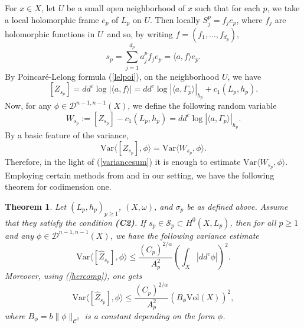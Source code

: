 \documentclass[11pt,leqno,oneside]{amsart}
\newtheorem{thm}{Theorem}[section]
\numberwithin{equation}{section}
\begin{document}
For \( x \in X \), let \( U \) be a small open neighborhood of \( x \) such that
for each \( p \), we take a local holomorphic frame \( e_{p} \) of \( L_{p} \) on \( U \). Then locally $S^{p}_{j}=f_{j}e_{p}$, where $f_{j}$ are holomorphic functions in $U$\, and so, by writing $f=(f_{1}, \ldots, f_{d_{p}}),$ $$s_{p}=\sum_{j=1}^{d_{p}}{a_{j}^{p}f_{j}e_{p}}=\langle a, f \rangle e_{p}.$$By Poincar\'{e}-Lelong formula (\ref{lelpoi}), on the neighborhood $U$, we have $$ [Z_{s_{p}}]=dd^{c}\log{|\langle a, f \rangle|}= dd^{c}\log|\langle a, \Gamma_{p}\rangle|_{h_{p}}+c_{1}(L_{p}, h_{p}).$$ Now, for any $\phi \in \mathcal{D}^{n-1, n-1}(X)$, we define the following random variable \begin{equation} \label{Wss} W_{s_{p}}:=[Z_{s_{p}}] - c_{1}(L_{p},  h_{p})=dd^{c}\log{|\langle a, \Gamma_{p} \rangle|_{h_{p}}}.\end{equation}By a basic feature of the variance, \begin{equation}\label{variancesum}
\mathrm{Var}\langle[Z_{s_{p}}], \phi \rangle= \mathrm{Var}\langle W_{s_{p}}, \phi \rangle .
\end{equation}
Therefore, in the light of (\ref{variancesum}) it is enough to estimate $\mathrm{Var}\langle W_{s_{p}}, \phi \rangle$.
 Employing  certain methods from \cite{SZ99} and \cite{SZ08} in our setting, we have the following theorem for codimension one.
\begin{thm}\label{cod1}
  Let \( (L_{p}, h_{p})_{p \geq 1} \), \( (X, \omega) \), and \( \sigma_{p} \) be as defined above. Assume that they satisfy the condition \textbf{(C2)}. If $s_{p}\in \mathcal{S}_{p} \subset H^{0}(X, L_{p})$, then for all $p\geq 1$ and any  $\phi \in\mathcal{D}^{n-1, n-1}(X)$, we have the following variance estimate \begin{equation}\label{ddcform}
  	\mathrm{Var} \langle [\widehat{Z}_{s_{p}}], \phi \rangle  \leq \frac{(C_{p})^{2/\alpha}}{A^{2}_{p}} (\int_{X}{|dd^{c} \phi|})^{2}.
  \end{equation}
Moreover, using (\ref{hercomp}), one gets \begin{equation*}\mathrm{Var} \langle [\widehat{Z}_{s_{p}}], \phi \rangle \leq \frac{(C_{p})^{2/\alpha}}{A^{2}_{p}} (B_{\phi} \mathrm{Vol}(X))^{2}, \end{equation*}where $B_{\phi}= b \|\phi\|_{\mathscr{C}^{2}}$ is a constant depending on the form $\phi$.
\end{thm}
\end{document}
